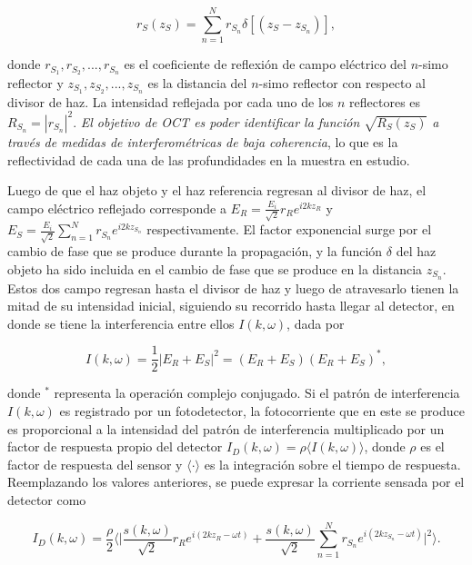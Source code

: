 \begin{equation}
	r_S(z_S) = \sum_{n=1}^{N} r_{S_n} \delta[(z_S - z_{S_n})],
\end{equation}

\noindent donde $r_{S_1}, r_{S_2}, ..., r_{S_n}$ es el coeficiente de reflexión de campo eléctrico del $n$-simo reflector y $ z_{S_1}, z_{S_2}, ..., z_{S_n}$ es la distancia del $n$-simo reflector con respecto al divisor de haz. La intensidad reflejada por cada uno de los $n$ reflectores es $R_{S_n} = |r_{S_n}|^2$. \emph{El objetivo de OCT es poder identificar la función $\sqrt{R_{S}(z_S)}$ a través de medidas de interferométricas de baja coherencia}, lo que es la reflectividad de cada una de las profundidades en la muestra en estudio.



Luego de que el haz objeto y el haz referencia regresan al divisor de haz, el campo eléctrico reflejado corresponde a $E_R = \frac{E_i}{\sqrt{2}}r_Re^{i2kz_R}$ y $E_S = \frac{E_i}{\sqrt{2}} \sum_{n=1}^{N}r_{S_n} e^{i2kz_{S_n}}$ respectivamente. El factor exponencial surge por el cambio de fase que se produce durante la propagación, y la función $\delta$ del haz objeto ha sido incluida en el cambio de fase que se produce en la distancia $z_{S_n}$. Estos dos campo regresan hasta el divisor de haz y luego de atravesarlo tienen la mitad de su intensidad inicial, siguiendo su recorrido hasta llegar al detector, en donde se tiene la interferencia entre ellos $I(k,\omega)$, dada por

\begin{equation}
	I(k,\omega) = \frac{1}{2}|E_R+E_S|^2 = (E_R + E_S)(E_R + E_S)^{\ast},
\end{equation}

\noindent donde $^{\ast}$ representa la operación complejo conjugado. Si el patrón de interferencia $I(k,\omega)$ es registrado por un fotodetector, la fotocorriente que en este se produce es proporcional a la intensidad del patrón de interferencia multiplicado por un factor de respuesta propio del detector $I_D(k, \omega) = \rho \langle I(k, \omega) \rangle$, donde $\rho$ es el factor de respuesta del sensor y $\langle \cdot \rangle$ es la integración sobre el tiempo de respuesta. Reemplazando los valores anteriores, se puede expresar la corriente sensada por el detector como

\begin{equation}
\label{eq:Id}
	I_D(k, \omega) = \frac{\rho}{2} \bigg\langle \bigg| \frac{s(k, \omega)}{\sqrt{2}} r_R e^{i(2kz_R-\omega t)} + \frac{s(k, \omega)}{\sqrt{2}} \sum_{n=1}^{N} r_{S_n} e^{i(2kz_{S_n} - \omega t)} \bigg|^2 \bigg\rangle.
\end{equation}

